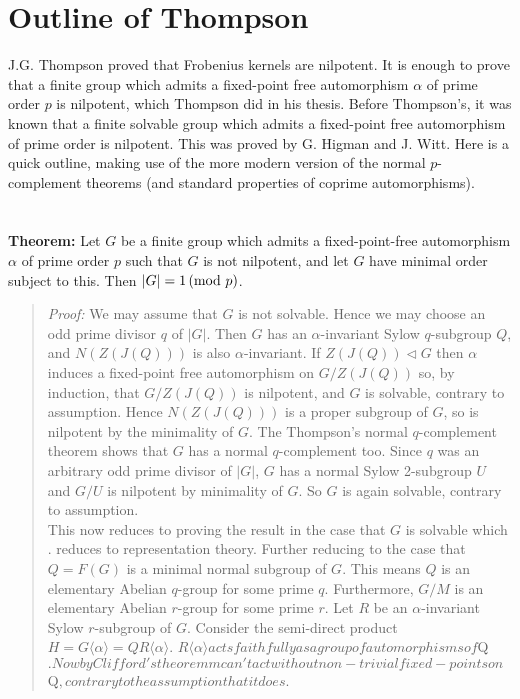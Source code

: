 \section{Outline of Thompson}
J.G. Thompson proved that Frobenius kernels are nilpotent.
It is enough to prove that a finite group which admits a fixed-point free automorphism $\alpha$
of prime order $p$ is nilpotent, which Thompson did in his thesis.
Before Thompson's, it was known that a finite solvable group which admits a fixed-point free automorphism 
of prime order is nilpotent. This was proved by G. Higman and J. Witt.
Here is a quick outline, making use of the more modern version of the normal $p$-complement theorems
(and standard properties of coprime automorphisms).\\
\\
\\
{\bf Theorem:}  Let $G$ be a finite group which admits a fixed-point-free automorphism 
$\alpha$ of prime order $p$ such that $G$ is not nilpotent, 
and let $G$  have minimal order subject to this. Then $|G|=1 \thinspace \textnormal{(mod } p \textnormal{)}$.
\begin{quote}
\emph{Proof:}
We may assume that $G$ is not solvable. Hence we may choose an 
odd prime divisor $q$ of $|G|$.
Then $G$ has an $\alpha$-invariant Sylow $q$-subgroup $Q$, and $N(Z(J(Q)))$
is also $\alpha$-invariant. 
If $Z(J(Q)) \lhd G$ then $\alpha$ induces a fixed-point free automorphism on 
$G/Z(J(Q))$ so, by induction, that $G/Z(J(Q))$ is nilpotent,
and $G$  is solvable, contrary to assumption.  Hence $N(Z(J(Q)))$
is a proper subgroup of $G$, so is nilpotent by the minimality of $G$.
The Thompson's normal $q$-complement theorem shows that $G$ has a normal $q$-complement too.
Since $q$ was an arbitrary odd prime divisor of $|G|$, $G$ has a normal Sylow 2-subgroup $U$ and 
$G/U$ is nilpotent by minimality of $G$. So $G$ is again solvable, contrary to assumption.
\\
This now reduces to proving the result in the case that $G$ is solvable which .
reduces to representation theory. 
Further reducing to the case that $Q=F(G)$ is a minimal normal subgroup of $G$. This means $Q$ is 
an elementary Abelian $q$-group for some prime $q$. 
Furthermore, $G/M$ is an elementary Abelian $r$-group for some prime $r$.
Let $R$ be an $\alpha$-invariant Sylow $r$-subgroup of $G$.
Consider the semi-direct product $H=G \langle \alpha \rangle= Q R \langle \alpha \rangle$.
$R\langle \alpha \rangle%
acts faithfully as a group of automorphisms of $Q$.
Now by Clifford's theoremm
$\alpha$ can't act without non-trivial fixed-points on $Q$, contrary to the assumption that it does.
$\end{quote}

